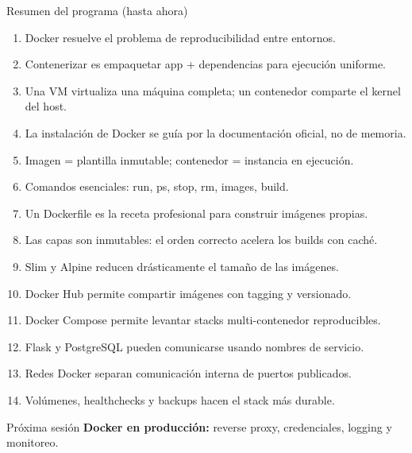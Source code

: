 \documentclass[aspectratio=169]{beamer}
\begin{document}
\begin{frame}{Resumen del programa (hasta ahora)}
  \tiny
  \begin{enumerate}
    \item Docker resuelve el problema de reproducibilidad entre entornos.
    \item Contenerizar es empaquetar app + dependencias para ejecución uniforme.
    \item Una VM virtualiza una máquina completa; un contenedor comparte el kernel del host.
    \item La instalación de Docker se guía por la documentación oficial, no de memoria.
    \item Imagen = plantilla inmutable; contenedor = instancia en ejecución.
    \item Comandos esenciales: run, ps, stop, rm, images, build.
    \item Un Dockerfile es la receta profesional para construir imágenes propias.
    \item Las capas son inmutables: el orden correcto acelera los builds con caché.
    \item Slim y Alpine reducen drásticamente el tamaño de las imágenes.
    \item Docker Hub permite compartir imágenes con tagging y versionado.
    \item Docker Compose permite levantar stacks multi-contenedor reproducibles.
    \item Flask y PostgreSQL pueden comunicarse usando nombres de servicio.
    \item Redes Docker separan comunicación interna de puertos publicados.
    \item Volúmenes, healthchecks y backups hacen el stack más durable.
  \end{enumerate}
  \vspace{-0.02cm}
  \begin{alertblock}{Próxima sesión}
    \textbf{Docker en producción:} reverse proxy, credenciales, logging y monitoreo.
  \end{alertblock}
\end{frame}
\end{document}
